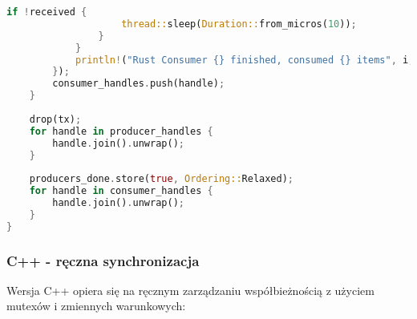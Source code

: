 \begin{lstlisting}[language=Rust, caption={Producent-Konsument w Rust z mpsc channels}, label={lst:rust_producer_consumer}]
                if !received {
                    thread::sleep(Duration::from_micros(10));
                }
            }
            println!("Rust Consumer {} finished, consumed {} items", i, local_consumed);
        });
        consumer_handles.push(handle);
    }
    
    drop(tx);
    for handle in producer_handles {
        handle.join().unwrap();
    }
    
    producers_done.store(true, Ordering::Relaxed);
    for handle in consumer_handles {
        handle.join().unwrap();
    }
}
\end{lstlisting}

\subsubsection{C++ - ręczna synchronizacja}
Wersja C++ opiera się na ręcznym zarządzaniu współbieżnością z użyciem mutexów i zmiennych warunkowych:
